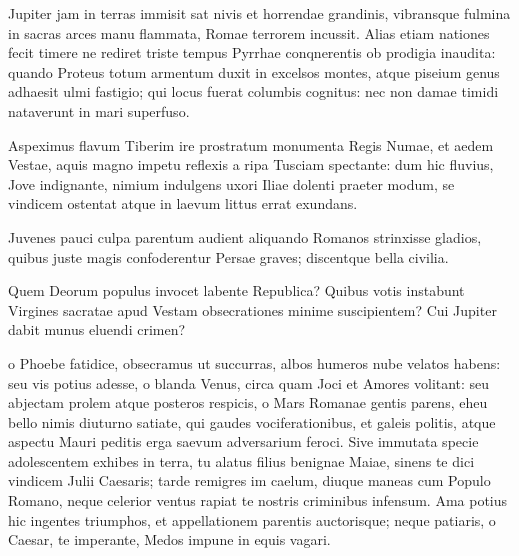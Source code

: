 {
\setlength{\parindent}{0pt}

Jupiter jam in terras immisit sat nivis et horrendae grandinis, vibransque fulmina in sacras arces manu flammata, Romae terrorem incussit. Alias etiam nationes fecit timere ne rediret triste tempus Pyrrhae conqnerentis ob prodigia inaudita: quando Proteus totum armentum duxit in excelsos montes, atque piseium genus adhaesit ulmi fastigio; qui locus fuerat columbis cognitus: nec non damae timidi nataverunt in mari superfuso. 

Aspeximus flavum Tiberim ire prostratum monumenta Regis Numae, et aedem Vestae, aquis magno impetu reflexis a ripa Tusciam spectante: dum hic fluvius, Jove indignante, nimium indulgens uxori Iliae dolenti praeter modum, se vindicem ostentat atque in laevum littus errat exundans. 

Juvenes pauci culpa parentum audient aliquando Romanos strinxisse gladios, quibus juste magis confoderentur Persae graves; discentque bella civilia. 

Quem Deorum populus invocet labente Republica? Quibus votis instabunt Virgines sacratae apud Vestam obsecrationes minime suscipientem? Cui Jupiter dabit munus eluendi crimen? 

o Phoebe fatidice, obsecramus ut succurras, albos humeros nube velatos habens: seu vis potius adesse, o blanda Venus, circa quam Joci et Amores volitant: seu abjectam prolem atque posteros respicis, o Mars Romanae gentis parens, eheu bello nimis diuturno satiate, qui gaudes vociferationibus, et galeis politis, atque aspectu Mauri peditis erga saevum adversarium feroci. Sive immutata specie adolescentem exhibes in terra, tu alatus filius benignae Maiae, sinens te dici vindicem Julii Caesaris; tarde remigres im caelum, diuque maneas cum Populo Romano, neque celerior ventus rapiat te nostris criminibus infensum. Ama potius hic ingentes triumphos, et appellationem parentis auctorisque; neque patiaris, o Caesar, te imperante, Medos impune in equis vagari.

}
